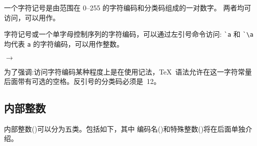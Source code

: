 \documentclass{book}
\begin{document}
一个字符记号是由范围在 0--255 的字符编码和分类码组成的一对数字。
两者均可访问，可以用作。

字符记号或一个单字母控制序列的字符编码，可以通过左引号命令访问:
\verb-`a- 和 \verb-`\a- 均代表 {\tt a} 的字符编码，可以用作整数。

\begin{disp} $\longrightarrow$
\end{disp}


为了强调:访问字符编码某种程度上是在使用记法，\TeX\ 语法允许在这一字符常量后面带有可选的空格。反引号的分类码必须是~12。

\subsection{内部整数}

内部整数()可以分为五类。包括如下，其中
编码名()和特殊整数()将在后面单独介绍。
\end{document}
